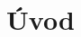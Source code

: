 \documentclass[a4paper,12pt]{report}	%
\newcommand{\autor}{Bc.~Jakub Flaška}
\begin{document}

\newpage
\tableofcontents




\chapter{Úvod}

\end{document}

